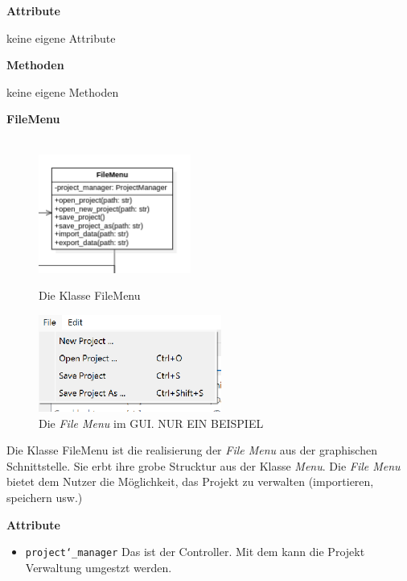 \documentclass{article}
\begin{document}
\textbf{{Attribute}}
\begin{itemize}
    keine eigene Attribute \newline
\end{itemize}
    
\textbf{{Methoden}}
\begin{itemize}
    keine eigene Methoden
\end{itemize}

\newpage
\textbf{\large{FileMenu}}\\\\
\begin{figure}[H]%
    \centering
    \begin{minipage}[b]{0.4\textwidth}
        \includegraphics[width=5cm]{entwurf/Entwurf_dokument/img/Alissa/FileMenu.png}
        \caption{Die Klasse FileMenu}
    \end{minipage}
    \hfill
    \begin{minipage}[b]{0.4\textwidth}
        \includegraphics[width=6cm]{entwurf/Entwurf_dokument/img/Alissa/EditMenuGUI.png} %
    \caption{Die \textit{File Menu} im GUI. NUR EIN BEISPIEL}
    \end{minipage}
\end{figure}
Die Klasse FileMenu ist die realisierung der \textit{File Menu} aus der graphischen Schnittstelle. Sie erbt ihre grobe Strucktur aus der Klasse \textit{Menu}. Die \textit{File Menu} bietet dem Nutzer die Möglichkeit, das Projekt zu verwalten (importieren, speichern usw.)
\newline \newline

\textbf{{Attribute}}
\begin{itemize}
\item \texttt{project\char`_manager} \newline Das ist der Controller. Mit dem kann die Projekt Verwaltung umgestzt werden.
\end{itemize}
\end{document}

